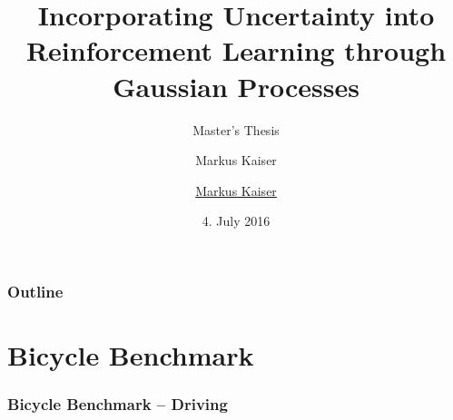 





\title{Incorporating Uncertainty into Reinforcement Learning through Gaussian Processes}
\author{Markus Kaiser}
\subtitle{Master's Thesis}
\author{\href{mailto:markus.kaiser@in.tum.de}{Markus Kaiser}}
\date{4. July 2016}




\begin{frame}[plain]
    \titlepage
\end{frame}

\begin{frame}
    \frametitle{Outline}

    \tableofcontents
\end{frame}

\section{Bicycle Benchmark}
\begin{frame}[label=bicycle_drive]
    \frametitle{Bicycle Benchmark -- Driving}

    \begin{columns}
        \begin{column}[c]{0.5\textwidth}
            \centering
            
        \end{column}
        \begin{column}[c]{0.5\textwidth}
            \centering
            \vspace{1cm}
             {
            }
        \end{column}
    \end{columns}
\end{frame}


